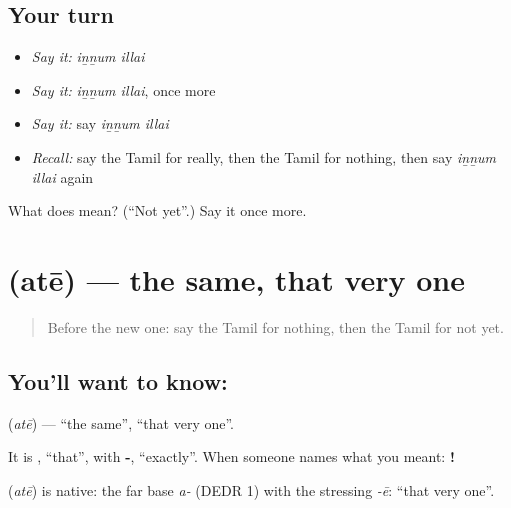 \subsection*{Your turn}
\begin{itemize}
\raggedright
  \item \emph{Say it:} \emph{iṉṉum illai}
  \item \emph{Say it:} \emph{iṉṉum illai}, once more
  \item \emph{Say it:} say \emph{iṉṉum illai}
  \item \emph{Recall:} say the Tamil for really, then the Tamil for nothing, then say \emph{iṉṉum illai} again
\end{itemize}

\begin{tcolorbox}[breakable,colback=teal!4,colframe=teal!35!black,title={Before you move on}]
What does   mean? (\textquotedblleft{}Not yet\textquotedblright{}.) Say it once more.
\end{tcolorbox}
\section[\texorpdfstring{\ta{அதே} (atē)}{அதே (atē)}]{ (atē) — the same, that very one}

\label{lesson:TA-C95-same}



\begin{quote}
Before the new one: say the Tamil for nothing, then the Tamil for not yet.
\end{quote}

\subsection*{You'll want to know: }
\textbf{} (\emph{atē}) — \textquotedblleft{}the same\textquotedblright{}, \textquotedblleft{}that very one\textquotedblright{}.

It is \textbf{}, \textquotedblleft{}that\textquotedblright{}, with \textbf{-}, \textquotedblleft{}exactly\textquotedblright{}. When someone names what you meant: \textbf{!}

\begin{cousinweb}
\textbf{} (\emph{atē}) is native: the far base \emph{a-} (DEDR 1) with the stressing \emph{-ē}: \textquotedblleft{}that very one\textquotedblright{}.
\end{cousinweb}


